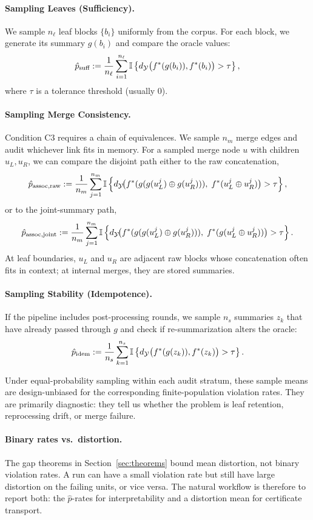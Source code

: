 \paragraph{Sampling Leaves (Sufficiency).}
We sample $n_\ell$ leaf blocks $\{b_i\}$ uniformly from the corpus. For each block, we generate its summary $g(b_i)$ and compare the oracle values:
\[
\hat{p}_{\text{suff}} := \frac{1}{n_\ell} \sum_{i=1}^{n_\ell} \mathbb{I}\left\{ d_{\mathcal{Y}}\big(f^\ast(g(b_i)), f^\ast(b_i)\big) > \tau \right\},
\]
where $\tau$ is a tolerance threshold (usually 0).

\paragraph{Sampling Merge Consistency.}
Condition C3 requires a chain of equivalences. We sample $n_m$ merge edges and audit whichever link fits in memory. For a sampled merge node $u$ with children $u_L, u_R$, we can compare the disjoint path either to the raw concatenation,
\[
\hat{p}_{\text{assoc,raw}} := \frac{1}{n_m} \sum_{j=1}^{n_m} \mathbb{I}\left\{ d_{\mathcal{Y}}\!\big(f^\ast(g(g(u_L^j) \oplus g(u_R^j))),\; f^\ast(u_L^j \oplus u_R^j)\big) > \tau \right\},
\]
or to the joint-summary path,
\[
\hat{p}_{\text{assoc,joint}} := \frac{1}{n_m} \sum_{j=1}^{n_m} \mathbb{I}\left\{ d_{\mathcal{Y}}\!\big(f^\ast(g(g(u_L^j) \oplus g(u_R^j))),\; f^\ast(g(u_L^j \oplus u_R^j))\big) > \tau \right\}.
\]
At leaf boundaries, $u_L$ and $u_R$ are adjacent raw blocks whose concatenation often fits in context; at internal merges, they are stored summaries.

\paragraph{Sampling Stability (Idempotence).}
If the pipeline includes post-processing rounds, we sample $n_s$ summaries $z_k$ that have already passed through $g$ and check if re-summarization alters the oracle:
\[
\hat{p}_{\text{idem}} := \frac{1}{n_s} \sum_{k=1}^{n_s} \mathbb{I}\left\{ d_{\mathcal{Y}}\big(f^\ast(g(z_k)), f^\ast(z_k)\big) > \tau \right\}.
\]

Under equal-probability sampling within each audit stratum, these sample means are design-unbiased for the corresponding finite-population violation rates. They are primarily diagnostic: they tell us whether the problem is leaf retention, reprocessing drift, or merge failure.

\paragraph{Binary rates vs.\ distortion.}
The gap theorems in Section~\ref{sec:theorems} bound mean distortion, not binary violation rates. A run can have a small violation rate but still have large distortion on the failing units, or vice versa. The natural workflow is therefore to report both: the $\hat{p}$-rates for interpretability and a distortion mean for certificate transport.

